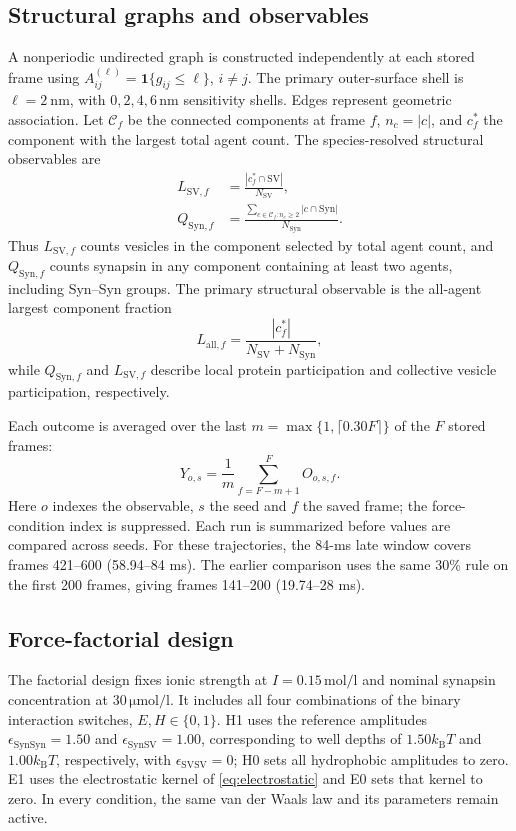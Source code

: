 \documentclass[11pt,letterpaper]{article}
\newcommand{\kBT}{k_{\mathrm B}T}
\newcommand{\Syn}{\mathrm{Syn}}
\newcommand{\SV}{\mathrm{SV}}
\begin{document}
\subsection{Structural graphs and observables}
A nonperiodic undirected graph is constructed independently at each stored
frame using \(A_{ij}^{(\ell)}=\mathbf1\{g_{ij}\leq\ell\}\), \(i\ne j\).
The primary outer-surface shell is \(\ell=\SI{2}{\nano\metre}\), with
\(0,2,4,6\,\si{\nano\metre}\) sensitivity shells. Edges represent geometric
association. Let \(\mathcal C_f\) be the
connected components at frame \(f\), \(n_c=|c|\), and \(c_f^*\) the component
with the largest total agent count. The species-resolved structural
observables are
\begin{align}
 L_{\SV,f}&=\frac{|c_f^*\cap\SV|}{N_{\SV}},\\
 Q_{\Syn,f}&=\frac{\sum_{c\in\mathcal C_f:n_c\geq2}|c\cap\Syn|}{N_{\Syn}} .
 \label{eq:endpoints}
\end{align}
Thus $L_{\SV,f}$ counts vesicles in the component selected by total agent
count, and $Q_{\Syn,f}$ counts synapsin in any component containing at
least two agents, including Syn--Syn groups. The primary structural
observable is the all-agent largest
component fraction
\begin{equation}
 L_{\mathrm{all},f}=\frac{|c_f^*|}{N_{\SV}+N_{\Syn}},
 \label{eq:all-largest}
\end{equation}
while $Q_{\Syn,f}$ and $L_{\SV,f}$ describe local protein participation
and collective vesicle participation, respectively.

Each outcome is averaged over the last
\(m=\max\{1,\lceil0.30F\rceil\}\) of the \(F\) stored frames:
\begin{equation}
 Y_{o,s}=\frac1m\sum_{f=F-m+1}^{F} O_{o,s,f}.
 \label{eq:late-summary}
\end{equation}
Here \(o\) indexes the observable, \(s\) the seed and \(f\) the saved
frame; the force-condition index is suppressed. Each run is summarized
before values are compared across seeds. For these trajectories, the
84-ms late window covers frames 421--600 (58.94--84 ms).
The earlier comparison uses the same 30\% rule on the first 200 frames,
giving frames 141--200 (19.74--28 ms).


\subsection{Force-factorial design}
The factorial design fixes ionic strength at
$I=0.15\,\si{\mole\per\litre}$ and nominal synapsin concentration at
$30\,\si{\micro\mole\per\litre}$. It includes all four combinations
of the binary interaction switches,
$E,H\in\{0,1\}$.
H1 uses the reference amplitudes $\epsilon_{\Syn\Syn}=1.50$ and
$\epsilon_{\Syn\SV}=1.00$, corresponding to well depths of $1.50\kBT$
and $1.00\kBT$, respectively, with
$\epsilon_{\SV\SV}=0$; H0 sets all hydrophobic amplitudes to zero.
E1 uses the electrostatic kernel of \cref{eq:electrostatic} and E0 sets
that kernel to zero. In every condition, the same van der Waals law and its
parameters remain active.
\end{document}
